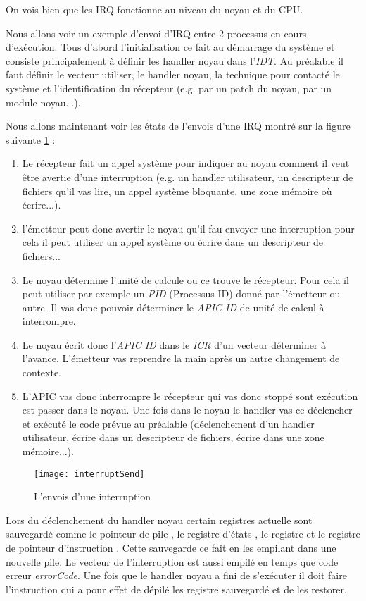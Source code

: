 On vois bien que les IRQ fonctionne au niveau du noyau et du CPU.

Nous allons voir un exemple d'envoi d'IRQ entre 2 processus en cours d'exécution.
Tous d'abord l'initialisation ce fait au démarrage du système et consiste principalement à définir les handler noyau dans l'\emph{IDT}.
Au préalable il faut définir le vecteur utiliser, le handler noyau, la technique pour contacté le système et l'identification du récepteur (e.g. par un patch du noyau, par un module noyau...).

Nous allons maintenant voir les états de l'envois d'une IRQ montré sur la figure suivante \ref{fig:sendInt} :

\begin{enumerate}[label=\protect\circled{\arabic*}]
  \item Le récepteur fait un appel système pour indiquer au noyau comment il veut être avertie d'une interruption (e.g. un handler utilisateur, un descripteur de fichiers qu'il vas lire, un appel système bloquante, une zone mémoire où écrire...).
  \item l'émetteur peut donc avertir le noyau qu'il fau envoyer une interruption pour cela il peut utiliser un appel système ou écrire dans un descripteur de fichiers...
  \item Le noyau détermine l'unité de calcule ou ce trouve le récepteur. Pour cela il peut utiliser par exemple un \emph{PID} (Processus ID) donné par l'émetteur ou autre.
  Il vas donc pouvoir déterminer le \emph{APIC ID} de unité de calcul à interrompre.
  \item Le noyau écrit donc l'\emph{APIC ID} dans le \emph{ICR} d'un vecteur déterminer à l'avance. L'émetteur vas reprendre la main après un autre changement de contexte.
  \item L'APIC vas donc interrompre le récepteur qui vas donc stoppé sont exécution est passer dans le noyau.
  Une fois dans le noyau le handler vas ce déclencher et exécuté le code prévue au préalable (déclenchement d'un handler utilisateur, écrire dans un descripteur de fichiers, écrire dans une zone mémoire...).
\end{enumerate}

\begin{figure}[H]
  \texttt{[image: interruptSend]}
  \caption{L'envois d'une interruption}
  \label{fig:sendInt}
\end{figure}

Lors du déclenchement du handler noyau certain registres actuelle sont sauvegardé comme le pointeur de pile , le registre d'états , le registre  et le registre de pointeur d'instruction .
Cette sauvegarde ce fait en les empilant dans une nouvelle pile. Le vecteur de l'interruption est aussi empilé en temps que code erreur \emph{errorCode}.
Une fois que le handler noyau a fini de s'exécuter il doit faire l'instruction  qui a pour effet de dépilé les registre sauvegardé et de les restorer.

